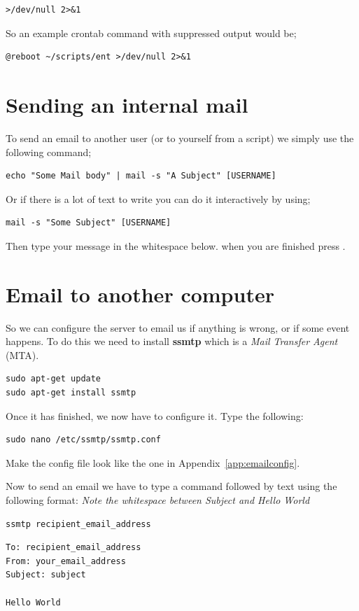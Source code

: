 \begin{verbatim}
>/dev/null 2>&1
\end{verbatim}

So an example crontab command with suppressed output would be;

\begin{lstlisting}
@reboot ~/scripts/ent >/dev/null 2>&1
\end{lstlisting}

\section{Sending an internal mail}

To send an email to another user (or to yourself from a script) we simply use the following command;

\begin{lstlisting}
echo "Some Mail body" | mail -s "A Subject" [USERNAME]
\end{lstlisting}

Or if there is a lot of text to write you can do it interactively by using;

\begin{lstlisting}
mail -s "Some Subject" [USERNAME]
\end{lstlisting}

Then type your message in the whitespace below.  when you are finished press .

\section{Email to another computer}
\label{sec:ssmtp}

So we can configure the server to email us if anything is wrong, or if some event happens.  To do this we need to install \textbf{ssmtp} which is a \textit{Mail Transfer Agent} (MTA).

\begin{lstlisting}
sudo apt-get update
sudo apt-get install ssmtp
\end{lstlisting}

Once it has finished, we now have to configure it.  Type the following:

\begin{lstlisting}
sudo nano /etc/ssmtp/ssmtp.conf
\end{lstlisting}

Make the config file look like the one in Appendix~\ref{app:emailconfig}.

Now to send an email we have to type a command followed by text using the following format: \textit{Note the whitespace between Subject and Hello World}

\begin{lstlisting}
ssmtp recipient_email_address
\end{lstlisting}

\begin{verbatim}
To: recipient_email_address
From: your_email_address
Subject: subject

Hello World
\end{verbatim}